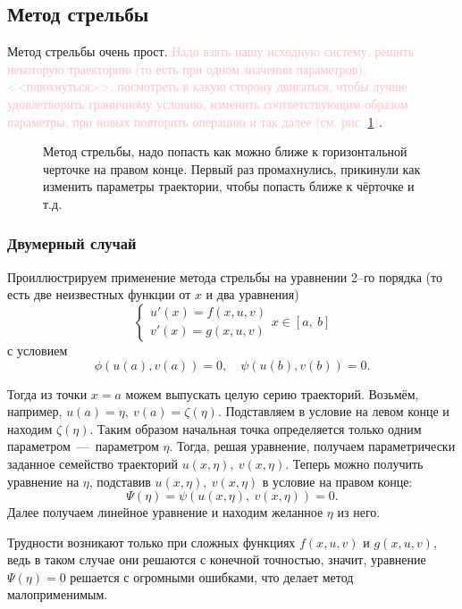\documentclass[a4,14pt,russian]{article}
\begin{document}
\subsection{Метод стрельбы}
    Метод стрельбы очень прост. \textcolor{pink}{Надо взять нашу исходную систему, решить некоторую траекторию (то есть при одном значении параметров), <<плюхнуться>>, посмотреть в какую сторону двигаться, чтобы лучше удовлетворить граничному условию, изменить соответствующим образом параметры, при новых повторить операцию и так далее (см. рис. \ref{graph1})}.
    \begin{figure}[h]
        \noindent{}
        \caption{Метод стрельбы, надо попасть как можно ближе к горизонтальной черточке на правом конце. Первый раз промахнулись, прикинули как изменить параметры траектории, чтобы попасть ближе к чёрточке и т.д.}
        \label{graph1}
    \end{figure} 
\subsubsection{Двумерный случай}
    Проиллюстрируем применение метода стрельбы на уравнении 2--го порядка (то есть две неизвестных функции от $x$ и два уравнения)
    \begin{equation}
    \begin{cases}
        u'(x) = f(x, u,v)\\ v'(x)=g(x,u,v)
    \end{cases}
    x \in [a,\ b]
    \end{equation}
    с условием $$\phi (u(a),v(a)) = 0, \quad \psi(u(b),v(b))=0.$$
    \par
    Тогда из точки $x=a$ можем выпускать целую серию траекторий. Возьмём, например, $u(a)=\eta,\ v(a)=\zeta(\eta)$. Подставляем в условие на левом конце и находим $\zeta(\eta)$. Таким образом начальная точка определяется только одним параметром~---~параметром $\eta$. Тогда, решая уравнение, получаем параметрически заданное семейство траекторий $u(x,\eta),\ v(x,\eta)$. Теперь можно получить уравнение на $\eta$, подставив $u(x,\eta),\ v(x,\eta)$ в условие на правом конце: $$\Psi(\eta) = \psi(u(x,\eta),\ v(x,\eta)) = 0.$$ Далее получаем линейное уравнение и находим желанное $\eta$ из него.
    \par
    Трудности возникают только при сложных функциях $f(x, u,v)$ и $g(x,u,v)$, ведь в таком случае они решаются с конечной точностью, значит, уравнение $\Psi(\eta) = 0$ решается с огромными ошибками, что делает метод малоприменимым.
\end{document}
